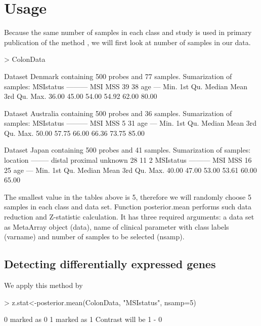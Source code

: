 \documentclass[a4paper]{report}
\begin{document}
\section*{Usage}
Because the same number of samples in each class and study is used in primary publication of the method \cite{Wang}, we will first look at number of samples in our data.
\begin{Schunk}
\begin{Sinput}
> ColonData
\end{Sinput}
\begin{Soutput}
Dataset Denmark  containing 500 probes and  77 samples. 
Sumarization of samples: 
MSIstatus 
--------- 
MSI MSS 
 39  38 
age 
--- 
   Min. 1st Qu.  Median    Mean 3rd Qu.    Max. 
  36.00   45.00   54.00   54.92   62.00   80.00 

Dataset Australia  containing 500 probes and  36 samples. 
Sumarization of samples: 
MSIstatus 
--------- 
MSI MSS 
  5  31 
age 
--- 
   Min. 1st Qu.  Median    Mean 3rd Qu.    Max. 
  50.00   57.75   66.00   66.36   73.75   85.00 

Dataset Japan  containing 500 probes and  41 samples. 
Sumarization of samples: 
location 
-------- 
  distal proximal  unknown 
      28       11        2 
MSIstatus 
--------- 
MSI MSS 
 16  25 
age 
--- 
   Min. 1st Qu.  Median    Mean 3rd Qu.    Max. 
  40.00   47.00   53.00   53.61   60.00   65.00 
\end{Soutput}
\end{Schunk}
The smallest value in the tables above is 5, therefore we will randomly choose 5 samples in each class and data set. Function {\ttfamily posterior.mean} performs such data reduction and Z-statistic calculation. It has three required arguments: a data set as MetaArray object ({\ttfamily data}), name of clinical parameter with class labels ({\ttfamily  varname}) and number of samples to be selected ({\ttfamily nsamp}). 
\subsection*{Detecting differentially expressed genes}
We apply this method by
\begin{Schunk}
\begin{Sinput}
> z.stat<-posterior.mean(ColonData, "MSIstatus", nsamp=5)
\end{Sinput}
\begin{Soutput}
0 marked as 0
1 marked as 1
Contrast will be 1 - 0 
\end{Soutput}
\end{Schunk}
\end{document}
